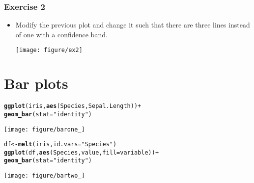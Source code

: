 \documentclass{beamer}\usepackage[]{graphicx}\usepackage[]{color}
\makeatletter
\newcommand{\hlstr}[1]{\textcolor[rgb]{0.192,0.494,0.8}{#1}}%
\newcommand{\hlkwd}[1]{\textcolor[rgb]{0.737,0.353,0.396}{\textbf{#1}}}%
\newenvironment{kframe}{%
 \def\at@end@of@kframe{}%
 \ifinner\ifhmode%
  \def\at@end@of@kframe{\end{minipage}}%
  \begin{minipage}{\columnwidth}%
 \fi\fi%
 \def\FrameCommand##1{\hskip\@totalleftmargin \hskip-\fboxsep
 \colorbox{shadecolor}{##1}\hskip-\fboxsep
     \hskip-\linewidth \hskip-\@totalleftmargin \hskip\columnwidth}%
 \MakeFramed {\advance\hsize-\width
   \@totalleftmargin\z@ \linewidth\hsize
   \@setminipage}}%
 {\par\unskip\endMakeFramed%
 \at@end@of@kframe}
\newenvironment{knitrout}{}{} %
\makeatother
\begin{document}
\begin{frame}[fragile]
\frametitle{Exercise 2}
\begin{itemize}
\item Modify the previous plot and change it such that there are three lines instead of one with a confidence band.
\begin{knitrout}\footnotesize
{}\color{fgcolor}

{\centering \texttt{[image: figure/ex2]} 

}



\end{knitrout}


\end{itemize}
\end{frame}


\section*{Bar plots}
\frame{\sectionpage}

\begin{frame}[fragile]
\begin{knitrout}\footnotesize
{}\color{fgcolor}\begin{kframe}
\begin{alltt}
\hlkwd{ggplot}(iris, \hlkwd{aes}(Species, Sepal.Length)) +
\hlkwd{geom_bar}(stat = \hlstr{"identity"})
\end{alltt}
\end{kframe}

{\centering \texttt{[image: figure/barone\_]} 

}



\end{knitrout}

\end{frame}

\begin{frame}[fragile]
\begin{knitrout}\footnotesize
{}\color{fgcolor}\begin{kframe}
\begin{alltt}
df  <- \hlkwd{melt}(iris, id.vars = \hlstr{"Species"})
\hlkwd{ggplot}(df, \hlkwd{aes}(Species, value, fill = variable)) +
\hlkwd{geom_bar}(stat = \hlstr{"identity"})
\end{alltt}
\end{kframe}

{\centering \texttt{[image: figure/bartwo\_]} 

}



\end{knitrout}

\end{frame}
\end{document}
